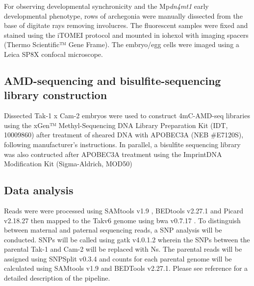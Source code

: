 For observing developmental synchronicity and the Mp\textit{dn4mt1} early developmental phenotype,  rows of archegonia were manually dissected from the base of digitate rays removing involucres. The fluorescent samples were fixed and stained using the iTOMEI protocol \citep{RN148} and mounted in iohexol with imaging spacers (Thermo Scientific™ Gene Frame). The embryo/egg cells were imaged using a Leica SP8X confocal microscope.

\subsection{AMD-sequencing and bisulfite-sequencing library construction}

Dissected Tak-1 x Cam-2 embryos were used to construct 4mC-AMD-seq libraries using the xGen™ Methyl-Sequencing DNA Library Preparation Kit (IDT, 10009860) after treatment of sheared DNA with APOBEC3A (NEB \#E7120S), following manufacturer’s instructions. In parallel, a bisulfite sequencing library was also contructed after APOBEC3A treatment using the Imprint\textregistered DNA Modification Kit (Sigma-Aldrich, MOD50)


\subsection{Data analysis}

Reads were were processed using SAMtools v1.9 \citep{RN174}, BEDtools v2.27.1 \citep{RN90} and Picard v2.18.27 \citep{RN173} then mapped to the Takv6 genome \citep{RN179} using bwa v0.7.17 \citep{RN182}. To distinguish between maternal and paternal sequencing reads, a SNP analysis will be conducted. SNPs will be called using gatk v4.0.1.2 \citep{RN177} wherein the SNPs between the parental Tak-1 and Cam-2 will be replaced with Ns. The parental reads will be assigned using SNPSplit v0.3.4 \citep{RN178} and counts for each parental genome will be calculated using SAMtools v1.9 and BEDTools v2.27.1. Please see reference \cite{RN160}  for a detailed description of the pipeline.

